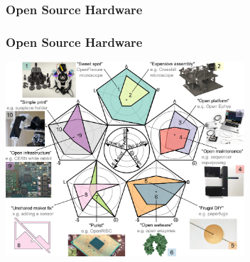 \documentclass{presentation}
\begin{document}
\begin{frame}\frametitle{Open Source Hardware}
\end{frame}

\begin{frame}\frametitle{Open Source Hardware}
  \centering
  \includegraphics[width=3.5in]{"./journal.pbio.3001931.g002.PNG"}
\end{frame}
\end{document}
